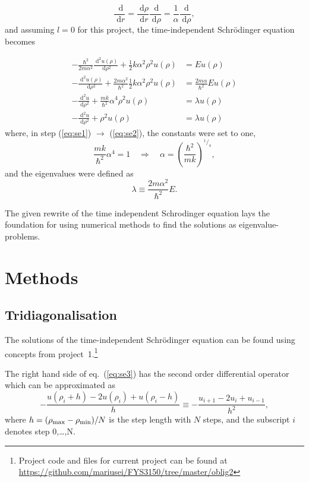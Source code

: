 \documentclass[a4paper,11pt]{article}
\newcommand{\diff}{\ensuremath{\; \text{d}}}
\begin{document}
\[ \frac{\diff}{\diff r} = \frac{\diff \rho}{\diff r} \frac{\diff}{\diff \rho} = \frac{1}{\alpha} \frac{\diff}{\diff \rho}, \]
and assuming $l=0$ for this project, the time-independent Schr\"{o}dinger equation becomes

\begin{align}
    -\frac{\hbar^2}{2m\alpha^2} \frac{\diff^2 u(\rho)}{\diff \rho^2} + \frac{1}{2} k \alpha^2 \rho^2 u(\rho) &= E u(\rho) \label{eq:se0} \\
    -\frac{\diff^2 u(\rho)}{\diff \rho^2} + \frac{2m \alpha^2}{\hbar^2}\frac{1}{2} k \alpha^2 \rho^2 u(\rho) &= \frac{2m\alpha}{\hbar^2} E u(\rho) \label{eq:se1} \\
    -\frac{\diff^2 u}{\diff \rho^2} + \frac{mk}{\hbar^2}\alpha^4 \rho^2 u(\rho) &= \lambda u(\rho) \label{eq:se2} \\
    -\frac{\diff^2 u}{\diff \rho^2} + \rho^2 u(\rho) &= \lambda u(\rho) \label{eq:se3}
\end{align}
where, in step (\ref{eq:se1}) $\to$ (\ref{eq:se2}), the constants were set to one,
\[ \frac{mk}{\hbar^2}\alpha^4 = 1 \quad \Rightarrow \quad \alpha = \left( \frac{\hbar^2}{mk}  \right)^{^1\! / _4}, \]
and the eigenvalues were defined as
\begin{equation}
    \lambda \equiv \frac{2m\alpha^2}{\hbar^2} E. 
    \label{eq:eigvals}
\end{equation}

The given rewrite of the time independent Schr{o}dinger equation lays the foundation for using numerical methods to find the solutions as eigenvalue-problems.

\section{Methods}
\subsection{Tridiagonalisation}
The solutions of the time-independent Schr\"{o}dinger equation can be found using concepts from project~1.\footnote{Project code and files for current project can be found at \url{https://github.com/mariusei/FYS3150/tree/master/oblig2}}

The right hand side of eq.~(\ref{eq:se3}) has the second order differential operator which can be approximated as
\[ -\frac{u\left( \rho_i + h \right) - 2u(\rho_i) + u\left( \rho_i - h \right)}{h} \equiv -\frac{u_{i+1} - 2u_i + u_{i-1}}{h^2}, \]
where $h = (\rho_{\rm max} - \rho_{\rm min})/N$ is the step length with $N$ steps, and the subscript $i$ denotes step 0,\dots,N. 
\end{document}

